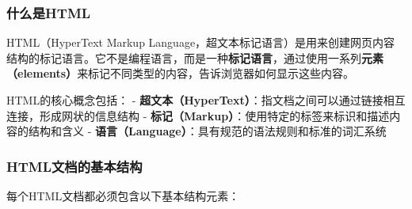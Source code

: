 \subsubsection{什么是HTML}\label{ux4ec0ux4e48ux662fhtml}

HTML（HyperText Markup Language，超文本标记语言）是用来创建网页内容结构的标记语言。它不是编程语言，而是一种\textbf{标记语言}，通过使用一系列\textbf{元素（elements）}来标记不同类型的内容，告诉浏览器如何显示这些内容。

HTML的核心概念包括： - \textbf{超文本（HyperText）}：指文档之间可以通过链接相互连接，形成网状的信息结构 - \textbf{标记（Markup）}：使用特定的标签来标识和描述内容的结构和含义 - \textbf{语言（Language）}：具有规范的语法规则和标准的词汇系统

\subsubsection{HTML文档的基本结构}\label{htmlux6587ux6863ux7684ux57faux672cux7ed3ux6784}

每个HTML文档都必须包含以下基本结构元素：

\begin{Shaded}
\begin{Highlighting}[]
\DataTypeTok{\textgreater{}}
\DataTypeTok{\textless{}}\OperatorTok{=}\DataTypeTok{\textgreater{}}
\DataTypeTok{\textless{}}\DataTypeTok{\textgreater{}}
    \DataTypeTok{\textless{}}\OperatorTok{=}\DataTypeTok{\textgreater{}}
    \DataTypeTok{\textless{}}\OperatorTok{=}\OperatorTok{=}\DataTypeTok{\textgreater{}}
    \DataTypeTok{\textless{}}\DataTypeTok{\textgreater{}}\DataTypeTok{\textless{}/}\DataTypeTok{\textgreater{}}
\DataTypeTok{\textless{}/}\DataTypeTok{\textgreater{}}
\DataTypeTok{\textless{}}\DataTypeTok{\textgreater{}}
    \DataTypeTok{\textless{}}\DataTypeTok{\textgreater{}}\DataTypeTok{\textless{}/}\DataTypeTok{\textgreater{}}
    \DataTypeTok{\textless{}}\DataTypeTok{\textgreater{}}\DataTypeTok{\textless{}/}\DataTypeTok{\textgreater{}}
\DataTypeTok{\textless{}/}\DataTypeTok{\textgreater{}}
\DataTypeTok{\textless{}/}\DataTypeTok{\textgreater{}}
\end{Highlighting}
\end{Shaded}

